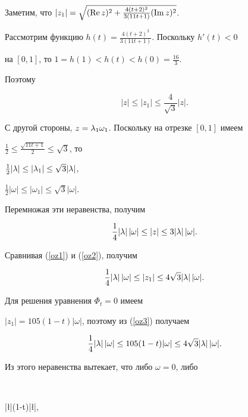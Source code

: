 \begin{pf}
Заметим, что $|z_1|=\sqrt{(\operatorname{Re} z)^2+\frac{4(t+2)^2}{3(11t+1)}(\operatorname{Im} z)^2}$.


Рассмотрим функцию $h(t)=\frac{4(t+2)^2}{3(11t+1)}$. Поскольку $h'(t)<0$


на $[0,1]$, то $1=h(1)<h(t)<h(0)=\frac{16}{3}$.


Поэтому 


\begin{equation}\label{oz1}


|z|\le|z_1|\le\frac{4}{\sqrt{3}}|z|.


\end{equation}





С другой стороны, $z=\lambda_1\omega_1$. Поскольку на отрезке $[0,1]$ имеем


$\frac{1}{2}\le \frac{\sqrt{11t+1}}{2}\le \sqrt{3}$, то 


$\frac{1}{2}|\lambda |\le |\lambda_1|\le \sqrt{3}|\lambda |$,


$\frac{1}{2}|\omega |\le |\omega_1|\le \sqrt{3}|\omega|$.


Перемножая эти неравенства, получим


\begin{equation}\label{oz2}


\frac{1}{4}|\l |\,|\omega |\le |z|\le 3|\l |\,|\omega |.


\end{equation}


Сравнивая (\ref{oz1}) и (\ref{oz2}), получим


\begin{equation}\label{oz3}


\frac{1}{4}|\l |\,|\omega |\le |z_1|\le 4\sqrt{3}|\l |\,|\omega |.


\end{equation}


 


Для решения уравнения $\Phi_t=0$ имеем


$|z_1|=105(1-t)|\omega |$, поэтому из (\ref{oz3}) получаем


$$


\frac{1}{4}|\l |\,|\omega|\le 105(1-t)|\omega|\le 4\sqrt{3}|\l |\,|\omega |.


$$


Из этого неравенства вытекает, что либо $\omega =0$, либо 


$$


|\l|(1-t)|\l |,



\end{pf}
